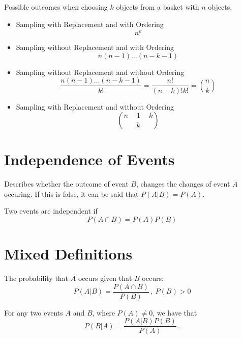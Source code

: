 Possible outcomes when choosing $k$ objects from a basket with $n$ objects.
\begin{itemize}
    \item Sampling with Replacement and with Ordering
        \[
            n^k
        \]
    \item Sampling without Replacement and with Ordering
        \[
            n(n - 1) \dots (n - k - 1)
        \]
    \item Sampling without Replacement and without Ordering
        \[
            \frac{n(n-1) \dots (n - k - 1)}{k!} = \frac {n!} {(n- k)! k!} = \binom n k
        \]
    \item Sampling with Replacement and without Ordering
        \[
            \binom {n - 1 - k} k
        \]
\end{itemize}

\section{Independence of Events}

Describes whether the outcome of event $B$, changes the changes of event $A$ occuring.
If this is false, it can be said that $P(A|B) = P(A)$.

\begin{definition}[Independence]
    Two events are independent if
    \[
        P(A \cap B) = P(A) P(B)
    \]
\end{definition}

\section{Mixed Definitions}

\begin{definition}
    The probability that $A$ occurs given that $B$ occurs:
    \[
        P(A|B) = \frac {P(A \cap B)} {P(B)}\,,\:P(B) > 0
    \]
\end{definition}

\begin{definition}
    For any two events $A$ and $B$, where $P(A) \neq 0$, we have that
    \[
        P(B|A) = \frac {P(A|B) P(B)} {P(A)}\,.
    \]
\end{definition}

